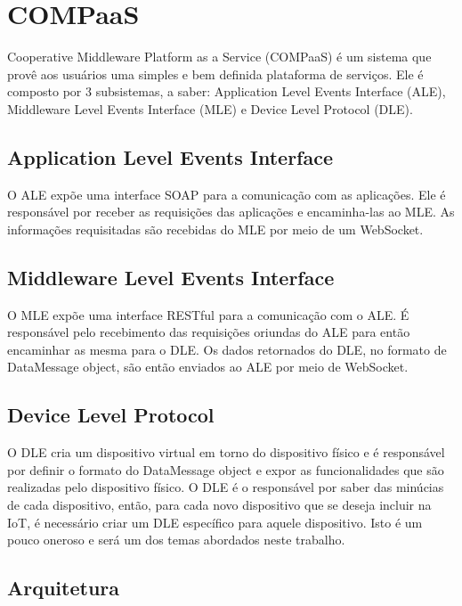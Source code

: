 \section{COMPaaS}
\label{sec:COMPaaS}
Cooperative Middleware Platform as a Service (COMPaaS) é um sistema que provê aos usuários uma simples e bem definida plataforma de serviços.
Ele é composto por 3 subsistemas, a saber:  Application Level Events Interface (ALE), Middleware Level Events Interface (MLE) e Device Level
Protocol (DLE).

\subsection{Application Level Events Interface}
O ALE expõe uma interface SOAP para a comunicação com as aplicações. Ele é responsável por receber as requisições das aplicações e encaminha-las ao MLE.
As informações requisitadas são recebidas do MLE por meio de um WebSocket.

\subsection{Middleware Level Events Interface}
O MLE expõe uma interface RESTful para a comunicação com o ALE. É responsável pelo recebimento das requisições oriundas do ALE para então encaminhar as mesma
para o DLE. Os dados retornados do DLE, no formato de DataMessage object, são então enviados ao ALE por meio de WebSocket.

\subsection{Device Level Protocol}
O DLE cria um dispositivo virtual em torno do dispositivo físico e é responsável por definir o formato do DataMessage object e expor as funcionalidades que
são realizadas pelo dispositivo físico. O DLE é o responsável por saber das minúcias de cada dispositivo, então, para cada novo dispositivo que se deseja
incluir na IoT, é necessário criar um DLE específico para aquele dispositivo. Isto é um pouco oneroso e será um dos temas abordados neste trabalho.

\subsection{Arquitetura}
